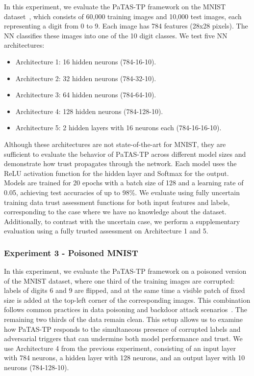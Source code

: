 In this experiment, we evaluate the \ac{PaTAS-TP} framework on the MNIST dataset~\cite{lecun1998mnist}, which consists of 60,000 training images and 10,000 test images, each representing a digit from 0 to 9. Each image has 784 features (28x28 pixels). The \ac{NN} classifies these images into one of the 10 digit classes. We test five \ac{NN} architectures:
\begin{itemize}
    \item Architecture 1: 16 hidden neurons (784-16-10).
    \item Architecture 2: 32 hidden neurons (784-32-10).
    \item Architecture 3: 64 hidden neurons (784-64-10).
    \item Architecture 4: 128 hidden neurons (784-128-10).
    \item Architecture 5: 2 hidden layers with 16 neurons each (784-16-16-10).
\end{itemize}
Although these architectures are not state-of-the-art for MNIST, they are sufficient to evaluate the behavior of \ac{PaTAS-TP} across different model sizes and demonstrate how trust propagates through the network. Each model uses the ReLU activation function for the hidden layer and Softmax for the output. Models are trained for 20 epochs with a batch size of 128 and a learning rate of 0.05, achieving test accuracies of up to 98\%. We evaluate using fully uncertain training data trust assessment functions for both input features and labels, corresponding to the case where we have no knowledge about the dataset.  Additionally, to contrast with the uncertain case, we perform a supplementary evaluation using a fully trusted assessment on Architecture 1 and 5.

\subsubsection{Experiment 3 - Poisoned MNIST}\label{exp:3}
In this experiment, we evaluate the \ac{PaTAS-TP} framework on a poisoned version of the MNIST dataset, where one third of the training images are corrupted: labels of digits 6 and 9 are flipped, and at the same time a visible patch of fixed size is added at the top-left corner of the corresponding images. This combination follows common practices in data poisoning and backdoor attack scenarios~\cite{chen2017targetedbackdoorattacksdeep}. The remaining two thirds of the data remain clean. This setup allows us to examine how \ac{PaTAS-TP} responds to the simultaneous presence of corrupted labels and adversarial triggers that can undermine both model performance and trust. We use Architecture 4 from the previous experiment, consisting of an input layer with 784 neurons, a hidden layer with 128 neurons, and an output layer with 10 neurons (784-128-10).

